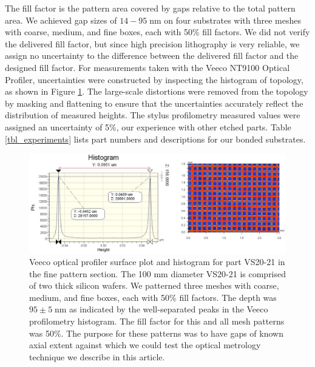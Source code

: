 The fill factor is the pattern area covered by gaps relative to the total pattern area.  We achieved gap sizes of $14-95\;$nm on four substrates with three meshes with coarse, medium, and fine boxes, each with 50\% fill factors.  We did not verify the delivered fill factor, but since high precision lithography is very reliable, we assign no uncertainty to the difference between the delivered fill factor and the designed fill factor.  For measurements taken with the Veeco NT9100 Optical Profiler, uncertainties were constructed by inspecting the histogram of topology, as shown in Figure \ref{figVS20pattern}.  The large-scale distortions were removed from the topology by masking and flattening to ensure that the uncertainties accurately reflect the distribution of measured heights.  The stylus profilometry measured values were assigned an uncertainty of 5\%, our experience with other etched parts.  Table \ref{tbl_experiments} lists part numbers and descriptions for our bonded substrates.

\begin{figure}[htbp]
\begin{center}
\includegraphics[width=1.0\columnwidth]{chSiGaps/figs/VS20fineGapCrop.pdf}
\end{center}
\caption[Lab measurement of synthetic gap extent with precision optical profilometry]{\label{figVS20pattern} Veeco optical profiler surface plot and histogram for part VS20-21 in the fine pattern section.  The 100 mm diameter VS20-21 is comprised of two thick silicon wafers.  We patterned three meshes with coarse, medium, and fine boxes, each with 50\% fill factors.  The depth was $95 \pm 5\;$nm as indicated by the well-separated peaks in the Veeco profilometry histogram.  The fill factor for this and all mesh patterns was 50\%.  The purpose for these patterns was to have gaps of known axial extent against which we could test the optical metrology technique we describe in this article.}
\end{figure}



